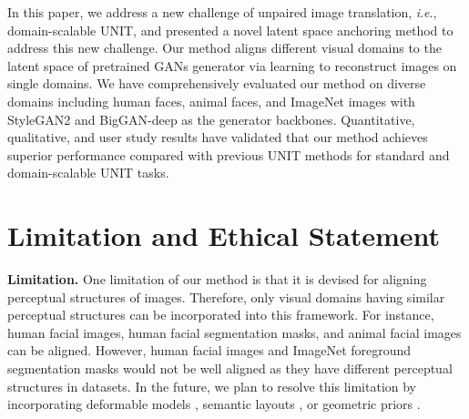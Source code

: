 \documentclass[10pt,journal,compsoc]{IEEEtran}
\newcommand{\ie}{\textit{i}.\textit{e}.}
\begin{document}
{In this paper, we address a new challenge of unpaired image translation, \ie, domain-scalable UNIT, and presented a novel latent space anchoring method to address this new challenge. Our method aligns different visual domains to the latent space of pretrained GANs generator via learning to reconstruct images on single domains. We have comprehensively evaluated our method on diverse domains including human faces, animal faces, and ImageNet images with StyleGAN2 \cite{stylegan2} and BigGAN-deep \cite{biggan} as the  generator backbones. Quantitative, qualitative, and user study results have validated that our method achieves superior performance compared with previous UNIT methods for standard and domain-scalable UNIT tasks.

\section{Limitation and Ethical Statement}

\noindent\textbf{Limitation.} One limitation of our method is that it is devised for aligning perceptual structures of images. Therefore, only visual domains having similar perceptual structures can be incorporated into this framework. For instance, human facial images, human facial segmentation masks, and animal facial images can be aligned. However, human facial images and ImageNet foreground segmentation masks would not be well aligned as they have different perceptual structures in datasets. In the future, we plan to resolve this limitation by incorporating deformable models \cite{jaderberg2015spatial,dai2017deformable}, semantic layouts \cite{zheng2022semantic,zheng2022cm}, or geometric priors \cite{tan2020crossnet++,zhang2020cross}. 

\vspace{0.5em}

}
\end{document}
